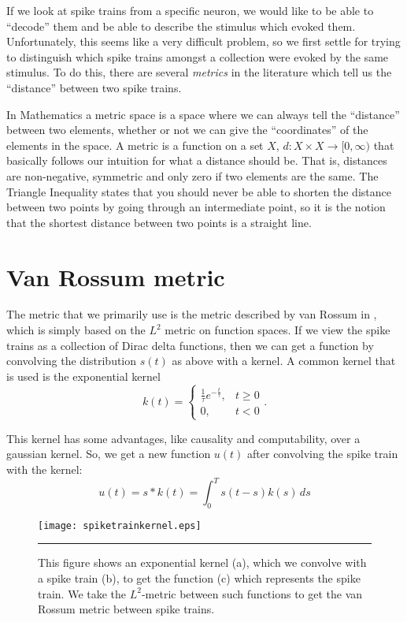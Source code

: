 \documentclass[a4paper,12pt]{report}
\begin{document}
If we look at spike trains from a specific neuron, we would like to be able to 
``decode'' them and be able to describe the stimulus which evoked them.  
Unfortunately, this seems like a very difficult problem, so we first settle for 
trying to distinguish which spike trains amongst a collection were evoked by 
the same stimulus.  To do this, there are several {\sl metrics} in the 
literature which tell us the ``distance'' between two spike trains.  

In Mathematics a metric space is a space where we can always tell the 
``distance'' between two elements, whether or not we can give the 
``coordinates'' of the elements in the space.  A metric is a function on a set 
$X$, $d: X\times X \rightarrow [0,\infty )$ that basically follows our 
intuition for what a distance should be. That is, distances are non-negative, 
symmetric and only zero if two elements are the same. The Triangle Inequality 
states that you should never be able to shorten the distance between two points 
by going through an intermediate point, so it is the notion that the shortest 
distance between two points is a straight line.


\section{Van Rossum metric}

The metric that we primarily use is the metric described by van Rossum in 
\cite{VanRossum2001a}, which is simply based on the $L^2$ metric on function 
spaces.  If we view the spike trains as a collection of Dirac delta functions, 
then we can get a function by convolving the distribution $s(t)$ as above with 
a kernel.  A common kernel that is used is the exponential kernel 
\begin{equation}
k(t) = \left\{ \begin{array}{ll}\frac{1}{\tau}e^{-\frac{t}{\tau}}, & t\geq 0 \\
0, & t<0\end{array} \right. .
\end{equation}

This kernel has some advantages, like causality and computability, over a 
gaussian kernel.  So, we get a new function $u(t)$ after convolving the spike 
train with the kernel:
\begin{equation}
u(t) = s*k(t) = \int_0^T s(t-s)k(s)\,ds
\end{equation}



\begin{figure}[tb]
  \centering
  \texttt{[image: spiketrainkernel.eps]}
  \rule{35em}{0.5pt}
  \caption{This figure shows  an exponential kernel (a), which we convolve with a spike train (b), to get the function (c) which represents the spike train.  We take the  $L^2$-metric between such functions to get the van Rossum metric between spike trains.}
  \label{stk}
\end{figure}
\end{document}
